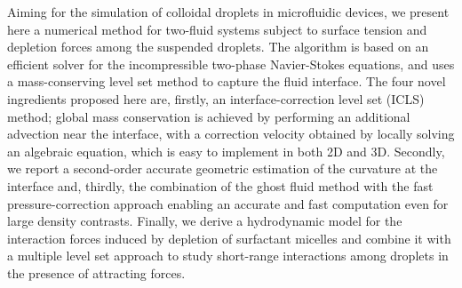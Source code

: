 %
\begin{paper}

\makepapertitle

%
\begin{paperabstract}
Aiming for the simulation of colloidal droplets in microfluidic devices, we present here a numerical method for two-fluid systems subject to surface tension and depletion forces among the suspended droplets. The algorithm is based on an efficient solver for the incompressible two-phase Navier-Stokes equations, and uses a mass-conserving level set method to capture the fluid interface. 
The four novel ingredients proposed here are, firstly, an interface-correction level set (ICLS) method; %
global mass conservation is achieved by performing an additional advection near the interface, with a correction velocity obtained by locally solving an algebraic equation, which is easy to implement in both 2D and 3D. 
Secondly, we report a second-order accurate geometric estimation of the curvature at the interface and, 
thirdly, the combination of the ghost fluid method with the fast pressure-correction approach enabling an accurate and fast computation even for large density contrasts. 
Finally, we derive %
a hydrodynamic model for the interaction forces
induced by depletion of surfactant micelles and combine it with a multiple level set approach to study short-range interactions among droplets in the presence of attracting forces.
\end{paperabstract}


%



%


%

\end{paper}
